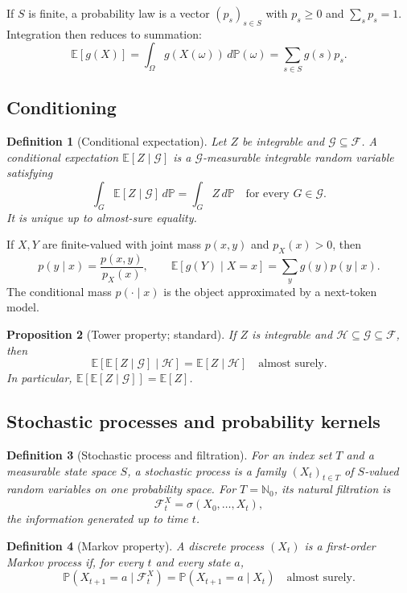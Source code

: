 \documentclass[11pt]{article}
\newtheorem{definition}{Definition}[section]
\newtheorem{proposition}[definition]{Proposition}
\newcommand{\E}{\mathbb E}
\newcommand{\N}{\mathbb N}
\newcommand{\1}{\mathbf 1}
\begin{document}
If $S$ is finite, a probability law is a vector $(p_s)_{s\in S}$ with
$p_s\ge0$ and $\sum_sp_s=1$. Integration then reduces to summation:
\[
 \E[g(X)]=\int_\Omega g(X(\omega))\,d\mathbb P(\omega)
 =\sum_{s\in S}g(s)p_s.
\]

\subsection{Conditioning}

\begin{definition}[Conditional expectation]
Let $Z$ be integrable and $\mathcal G\subseteq\mathcal F$. A conditional
expectation $\E[Z\mid\mathcal G]$ is a $\mathcal G$-measurable integrable
random variable satisfying
\[
 \int_G\E[Z\mid\mathcal G]\,d\mathbb P
 =\int_G Z\,d\mathbb P
 \quad\text{for every }G\in\mathcal G.
\]
It is unique up to almost-sure equality.
\end{definition}

If $X,Y$ are finite-valued with joint mass $p(x,y)$ and $p_X(x)>0$, then
\[
 p(y\mid x)=\frac{p(x,y)}{p_X(x)},
 \qquad
 \E[g(Y)\mid X=x]=\sum_y g(y)p(y\mid x).
\]
The conditional mass $p(\cdot\mid x)$ is the object approximated by a
next-token model.

\begin{proposition}[Tower property; standard]
If $Z$ is integrable and $\mathcal H\subseteq\mathcal G\subseteq\mathcal F$,
then
\[
 \E[\E[Z\mid\mathcal G]\mid\mathcal H]
 =\E[Z\mid\mathcal H]
 \quad\text{almost surely}.
\]
In particular, $\E[\E[Z\mid\mathcal G]]=\E[Z]$.
\end{proposition}

\subsection{Stochastic processes and probability kernels}

\begin{definition}[Stochastic process and filtration]
For an index set $T$ and a measurable state space $S$, a stochastic process is
a family $(X_t)_{t\in T}$ of $S$-valued random variables on one probability
space. For $T=\N_0$, its natural filtration is
\[
 \mathcal F_t^X=\sigma(X_0,\ldots,X_t),
\]
the information generated up to time $t$.
\end{definition}

\begin{definition}[Markov property]
A discrete process $(X_t)$ is a first-order Markov process if, for every $t$
and every state $a$,
\[
 \mathbb P(X_{t+1}=a\mid\mathcal F_t^X)
 =\mathbb P(X_{t+1}=a\mid X_t)
 \quad\text{almost surely}.
\]
\end{definition}
\end{document}
